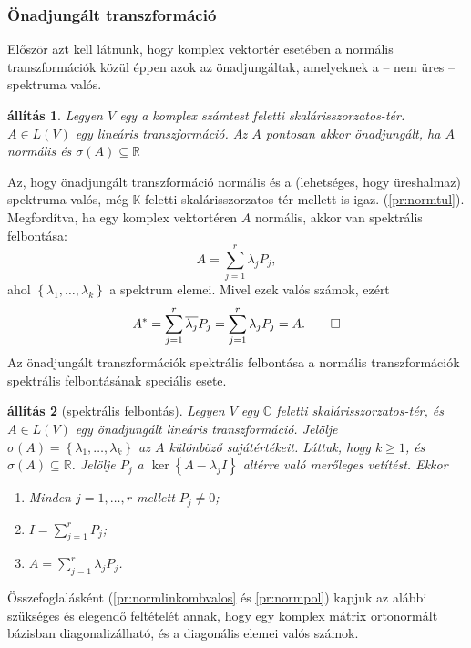 \documentclass[a4paper, showtrims]{memoir}
\makeatletter
\renewenvironment{proof}[1][\proofname]
    {\par\pushQED{\qed}%
    \normalfont \topsep6\p@\@plus6\p@\relax
    \trivlist
    \item[\hskip\labelsep
        \itshape
    #1\@addpunct{:}]\ignorespaces}
    {\popQED\endtrivlist\@endpefalse}
\theoremstyle{plain}
\newtheorem{proposition}{állítás}[chapter]
\theoremstyle{remark}
\theoremstyle{definition}
\makeatother
\begin{document}
\subsubsection{Önadjungált transzformáció}
Először azt kell látnunk,
hogy komplex vektortér esetében a normális transzformációk közül éppen azok az önadjungáltak,
amelyeknek a -- nem üres -- spektruma valós.
\begin{proposition}
	Legyen $V$ egy a komplex számtest feletti skalárisszorzatos-tér.
	$A\in L\left( V \right)$ egy lineáris transzformáció.
	Az $A$ pontosan akkor önadjungált, ha $A$ normális és $\sigma\left( A \right)\subseteq\mathbb{R}$
\end{proposition}
\begin{proof}
	Az, hogy önadjungált transzformáció normális és a (lehetséges, hogy üreshalmaz) spektruma valós,
	még $\mathbb{K}$ feletti skalárisszorzatos-tér mellett is igaz. (\ref{pr:normtul}).
	Megfordítva,
	ha egy komplex vektortéren $A$ normális, akkor van spektrális felbontása:
	\[
		A=\sum_{j=1}^r\lambda_jP_j,
	\]
	ahol $\left\{ \lambda_1,\ldots,\lambda_k \right\}$ a spektrum elemei.
	Mivel ezek valós számok,
	ezért
	\[
		A^\ast=\sum_{j=1}^r\overline{\lambda_j}P_j=
		\sum_{j=1}^r\lambda_jP_j=A.
		\qedhere
	\]
\end{proof}
Az önadjungált transzformációk spektrális felbontása
a normális transzformációk spektrális felbontásának speciális esete.
\begin{proposition}[spektrális felbontás]
	Legyen $V$ egy $\mathbb{C}$ feletti skalárisszorzatos-tér, és $A\in L\left( V \right)$
	egy önadjungált lineáris transzformáció.
	Jelölje $\sigma\left( A \right)=\left\{\lambda_1,\ldots,\lambda_k  \right\}$ az $A$ különböző sajátértékeit.
	Láttuk, hogy $k\geq 1$, és $\sigma\left( A \right)\subseteq \mathbb{R}$.
	Jelölje $P_j$ a $\ker\left\{ A-\lambda_jI \right\}$ altérre való merőleges vetítést.
	Ekkor
	\begin{enumerate}
		\item Minden $j=1,\ldots,r$ mellett $P_j\neq 0$;
		\item $I=\sum_{j=1}^rP_j$;
		\item $A=\sum_{j=1}^r\lambda_jP_j$.
		      \qedhere
	\end{enumerate}
\end{proposition}
Összefoglalásként (\ref{pr:normlinkombvalos} és \ref{pr:normpol}) kapjuk az alábbi szükséges és elegendő feltételét annak,
hogy egy komplex mátrix ortonormált bázisban diagonalizálható, és a diagonális elemei valós számok.
\end{document}
